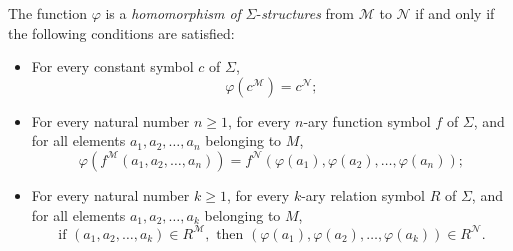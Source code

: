 \begin{definition}
  The function $\varphi$ is a \textit{homomorphism of} $\Sigma$-\textit{structures} from $\mathcal{M}$ to $\mathcal{N}$ if and only if the following conditions are satisfied:
  \begin{itemize}
      \item For every constant symbol $c$ of $\Sigma$,
      \[
      \varphi(c^{\mathcal{M}}) \mathop{=} c^{\mathcal{N}};
      \]
      \item For every natural number $n \mathop{\geq} 1$, for every $n$-ary function symbol $f$ of $\Sigma$, and for all elements $a_1, a_2, \ldots, a_n$ belonging to $M$,
      \[
      \varphi(f^{\mathcal{M}}(a_1, a_2, \ldots, a_n)) \mathop{=} f^{\mathcal{N}}(\varphi(a_1), \varphi(a_2), \ldots, \varphi(a_n));
      \]
      \item For every natural number $k \mathop{\geq} 1$, for every $k$-ary relation symbol $R$ of $\Sigma$, and for all elements $a_1, a_2, \ldots, a_k$ belonging to $M$,
      \[
      \text{if } (a_1, a_2, \ldots, a_k) \mathop{\in} R^{\mathcal{M}}, \text{ then } (\varphi(a_1), \varphi(a_2), \ldots, \varphi(a_k)) \mathop{\in} R^{\mathcal{N}}.
      \]
  \end{itemize}
  \end{definition}

